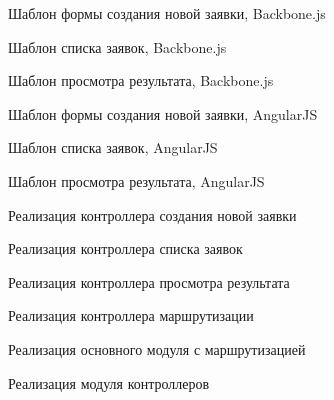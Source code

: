 
\lstset{
  language=HTML,
  basicstyle=\footnotesize\singlespace
}

\centerline{Шаблон формы создания новой заявки, Backbone.js}


\centerline{Шаблон списка заявок, Backbone.js}


\centerline{Шаблон просмотра результата, Backbone.js}


\centerline{Шаблон формы создания новой заявки, AngularJS}


\centerline{Шаблон списка заявок, AngularJS}


\centerline{Шаблон просмотра результата, AngularJS}


\lstset{
  language=JavaScript
}

\centerline{Реализация контроллера создания новой заявки}


\centerline{Реализация контроллера списка заявок}


\centerline{Реализация контроллера просмотра результата}


\centerline{Реализация контроллера маршрутизации}



\centerline{Реализация основного модуля с маршрутизацией}


\centerline{Реализация модуля контроллеров}

